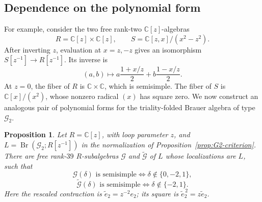 \documentclass[11pt,a4paper]{amsart}
\newtheorem{proposition}[theorem]{Proposition}
\theoremstyle{uprightdefinition}
\theoremstyle{remark}\newtheorem{remark}[theorem]{Remark}
\begin{document}
\subsection{Dependence on the polynomial form}
For example, consider the two free rank-two $\mathbb C[z]$-algebras
\[
 R=\mathbb C[z]\times\mathbb C[z],\qquad
 S=\mathbb C[z,x]/(x^2-z^2).
\]
After inverting $z$, evaluation at $x=z,-z$ gives an isomorphism
$S[z^{-1}]\to R[z^{-1}]$. Its inverse is
\[
 (a,b)\longmapsto a\frac{1+x/z}{2}+b\frac{1-x/z}{2}.
\]
At $z=0$, the fiber of $R$ is $\mathbb C\times\mathbb C$, which is semisimple.
The fiber of $S$ is $\mathbb C[x]/(x^2)$, whose nonzero radical $(x)$ has square zero.
We now construct an analogous pair of polynomial forms for the
triality-folded Brauer algebra of type $\mathscr{G}_2$.

\begin{proposition}\label{thm:g2-dual-zero-forms}
Let $R=\mathbb C[z]$, with loop parameter $z$, and
$L=\operatorname{Br}(\mathscr{G}_2;R[z^{-1}])$ in the normalization of
Proposition~\ref{prop:G2-criterion}. There are free rank-$39$
$R$-subalgebras $\mathcal G$ and $\widetilde{\mathcal G}$ of $L$
whose localizations are $L$, such that
\[
 \mathcal G(\delta)\text{ is semisimple}
 \Longleftrightarrow\delta\notin\{0,-2,1\},
\]
\[
 \widetilde{\mathcal G}(\delta)\text{ is semisimple}
 \Longleftrightarrow\delta\notin\{-2,1\}.
\]
Here the rescaled contraction is $\widetilde e_2=z^{-2}e_2$;
its square is $\widetilde e_2^{\,2}=z\widetilde e_2$.
\end{proposition}
\end{document}
